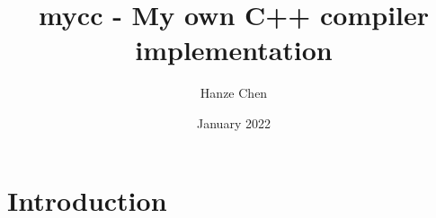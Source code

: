 \documentclass{article}
\title{mycc - My own C++ compiler implementation}
\author{Hanze Chen}
\date{January 2022}
\begin{document}
\maketitle

\section{Introduction}

\printindex
\end{document}
